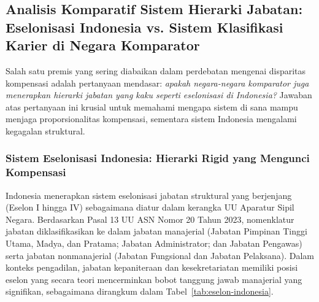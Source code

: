 \documentclass[12pt, a4paper]{article}
\begin{document}
\subsection{Analisis Komparatif Sistem Hierarki Jabatan: Eselonisasi Indonesia vs. Sistem Klasifikasi Karier di Negara Komparator}

Salah satu premis yang sering diabaikan dalam perdebatan mengenai disparitas kompensasi adalah pertanyaan mendasar: \textit{apakah negara-negara komparator juga menerapkan hierarki jabatan yang kaku seperti eselonisasi di Indonesia?} Jawaban atas pertanyaan ini krusial untuk memahami mengapa sistem di sana mampu menjaga proporsionalitas kompensasi, sementara sistem Indonesia mengalami kegagalan struktural.

\subsubsection{Sistem Eselonisasi Indonesia: Hierarki Rigid yang Mengunci Kompensasi}

Indonesia menerapkan sistem eselonisasi jabatan struktural yang berjenjang (Eselon I hingga IV) sebagaimana diatur dalam kerangka UU Aparatur Sipil Negara. Berdasarkan Pasal 13 UU ASN Nomor 20 Tahun 2023, nomenklatur jabatan diklasifikasikan ke dalam jabatan manajerial (Jabatan Pimpinan Tinggi Utama, Madya, dan Pratama; Jabatan Administrator; dan Jabatan Pengawas) serta jabatan nonmanajerial (Jabatan Fungsional dan Jabatan Pelaksana). Dalam konteks pengadilan, jabatan kepaniteraan dan kesekretariatan memiliki posisi eselon yang secara teori mencerminkan bobot tanggung jawab manajerial yang signifikan, sebagaimana dirangkum dalam Tabel~\ref{tab:eselon-indonesia}.
\end{document}
